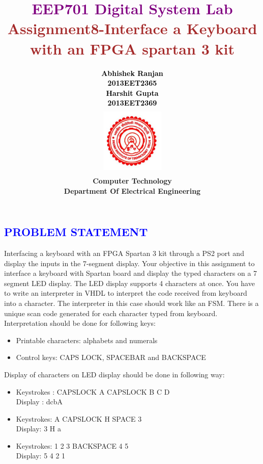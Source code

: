 \documentclass[a4paper,12pt]{report}
\title{\bfseries\huge \textcolor{purple}{EEP701 Digital System Lab} \\{\textcolor{brown}{Assignment8-Interface a Keyboard with an FPGA spartan 3 kit}}}
\author{\bfseries\large\textcolor{black} {Abhishek Ranjan}\\ {\textcolor{black}{2013EET2365}}\\{\bfseries\large\textcolor{black}{Harshit Gupta}} \\{\textcolor{black}{2013EET2369}}\\
\includegraphics[width=3cm,height=3.4cm]{./iit.png}\\\noindent Computer Technology\\
\noindent Department Of Electrical Engineering}
\begin{document}
\maketitle
\tableofcontents




\begin{center}
\chapter{\textcolor{blue}{PROBLEM STATEMENT}}
\end{center}
\noindent  Interfacing a keyboard with an FPGA Spartan 3 kit through a PS2 port and display the inputs in the 7-segment
display. Your objective in this assignment
 to interface a  keyboard with Spartan board and display the typed characters on a 7
segment LED display. The LED display supports 4 characters at once.
You have to write an interpreter in VHDL to interpret the code received from keyboard into a
character. The interpreter in this case should work like an FSM. There is a unique scan code
generated for each character typed from keyboard. Interpretation should be done for following
keys:
 \begin{itemize} \item Printable characters: alphabets and numerals
 \item  Control keys: CAPS LOCK, SPACEBAR and BACKSPACE
 \end{itemize}

 
 \noindent Display of characters on LED display should be done in following way:
\begin{itemize} \item Keystrokes : CAPSLOCK A CAPSLOCK B C D
\\Display : dcbA
\item Keystrokes: A CAPSLOCK H SPACE 3
\\Display: 3   H a
\item Keystrokes: 1 2 3 BACKSPACE 4 5
\\Display: 5 4 2 1
\end{itemize}
\end{document}

